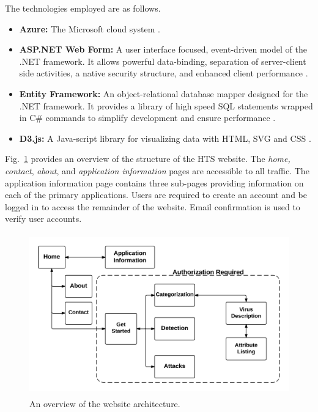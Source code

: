 The technologies employed are as follows.
\begin{itemize}
	\item \textbf{Azure:} The Microsoft cloud system \cite{Azure}.
	\item \textbf{ASP.NET Web Form:} A user interface focused, event-driven model of the .NET framework.
	It allows powerful data-binding, separation of server-client side activities, a native security structure, and enhanced client performance \cite{ASP}.
	\item \textbf{Entity Framework:} An object-relational database mapper designed for the .NET framework.
	It provides a library of high speed SQL statements wrapped in C\# commands to simplify development and ensure performance \cite{Entity}.
	\item \textbf{D3.js:} A Java-script library for visualizing data with HTML, SVG and CSS \cite{D3}.
\end{itemize}
Fig.~\ref{fig:WebsiteArchitecture} provides an overview of the structure of the HTS website.
The \textit{home, contact}, \textit{about}, and \textit{application information} pages are accessible to all traffic.
The application information page contains three sub-pages providing information on each of the primary applications.
Users are required to create an account and be logged in to access the remainder of the website.
Email confirmation is used to verify user accounts.
\begin{figure}[h]
	\centering
	\includegraphics[height = 7cm]{figures/WebsiteArchitecture}
	\caption{An overview of the website architecture.}
	\label{fig:WebsiteArchitecture}
\end{figure}


